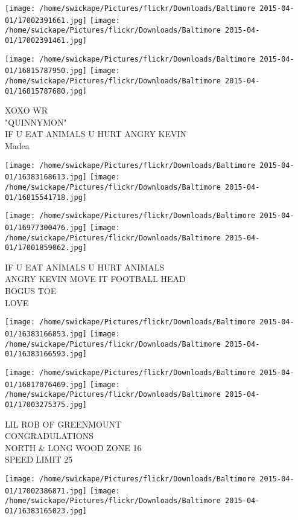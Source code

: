 \documentclass[10pt,letterpaper]{article}
\begin{document}
\texttt{[image: /home/swickape/Pictures/flickr/Downloads/Baltimore 2015-04-01/17002391661.jpg]}
\texttt{[image: /home/swickape/Pictures/flickr/Downloads/Baltimore 2015-04-01/17002391461.jpg]}

\texttt{[image: /home/swickape/Pictures/flickr/Downloads/Baltimore 2015-04-01/16815787950.jpg]}
\texttt{[image: /home/swickape/Pictures/flickr/Downloads/Baltimore 2015-04-01/16815787680.jpg]}

XOXO WR\\
"QUINNYMON"\\
IF U EAT ANIMALS U HURT ANGRY KEVIN\\
Madea\\
\pagebreak

\texttt{[image: /home/swickape/Pictures/flickr/Downloads/Baltimore 2015-04-01/16383168613.jpg]}
\texttt{[image: /home/swickape/Pictures/flickr/Downloads/Baltimore 2015-04-01/16815541718.jpg]}

\texttt{[image: /home/swickape/Pictures/flickr/Downloads/Baltimore 2015-04-01/16977300476.jpg]}
\texttt{[image: /home/swickape/Pictures/flickr/Downloads/Baltimore 2015-04-01/17001859062.jpg]}

IF U EAT ANIMALS U HURT ANIMALS\\
ANGRY KEVIN MOVE IT FOOTBALL HEAD\\
BOGUS TOE\\
LOVE\\
\pagebreak

\texttt{[image: /home/swickape/Pictures/flickr/Downloads/Baltimore 2015-04-01/16383166853.jpg]}
\texttt{[image: /home/swickape/Pictures/flickr/Downloads/Baltimore 2015-04-01/16383166593.jpg]}

\texttt{[image: /home/swickape/Pictures/flickr/Downloads/Baltimore 2015-04-01/16817076469.jpg]}
\texttt{[image: /home/swickape/Pictures/flickr/Downloads/Baltimore 2015-04-01/17003275375.jpg]}

LIL ROB OF GREENMOUNT\\
CONGRADULATIONS\\
NORTH \& LONG WOOD ZONE 16\\
SPEED LIMIT 25\\
\pagebreak

\texttt{[image: /home/swickape/Pictures/flickr/Downloads/Baltimore 2015-04-01/17002386871.jpg]}
\texttt{[image: /home/swickape/Pictures/flickr/Downloads/Baltimore 2015-04-01/16383165023.jpg]}
\end{document}
